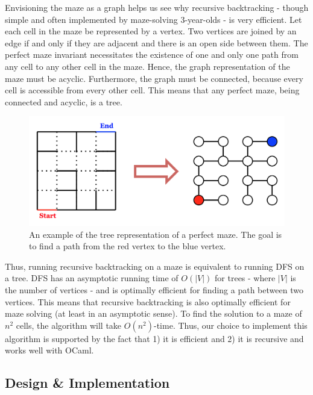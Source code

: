 \documentclass[11pt, margin=1in]{article}
\newcommand{\tab}{\par \qquad}
\newcommand{\card}[1]{\ensuremath{\left\vert#1\right\vert}}
\begin{document}
\tab Envisioning the maze as a graph helps us see why recursive backtracking - though simple and often implemented by maze-solving 3-year-olds - is very efficient.  Let each cell in the maze be represented by a vertex.  Two vertices are joined by an edge if and only if they are adjacent and there is an open side between them.  The perfect maze invariant necessitates the existence of one and only one path from any cell to any other cell in the maze.  Hence, the graph representation of the maze must be acyclic.  Furthermore, the graph must be connected, because every cell is accessible from every other cell.  This means that any perfect maze, being connected and acyclic, is a tree.                  

\begin{figure}[H]
\begin{center}
\includegraphics[scale=0.7]{tree.jpg}
\caption{An example of the tree representation of a perfect maze.  The goal is to find a path from the red vertex to the blue vertex.}
\end{center}
\end{figure}

Thus, running recursive backtracking on a maze is equivalent to running DFS on a tree.  DFS has an asymptotic running time of $O(\card{V})$ for trees - where $\card{V}$ is the number of vertices - and is optimally efficient for finding a path between two vertices.  This means that recursive backtracking is also optimally efficient for maze solving (at least in an asymptotic sense).  To find the solution to a maze of $n^2$ cells, the algorithm will take $O(n^2)$-time.  Thus, our choice to implement this algorithm is supported by the fact that 1) it is efficient and 2) it is recursive and works well with OCaml.      

\subsection{Design \& Implementation}
\end{document}
